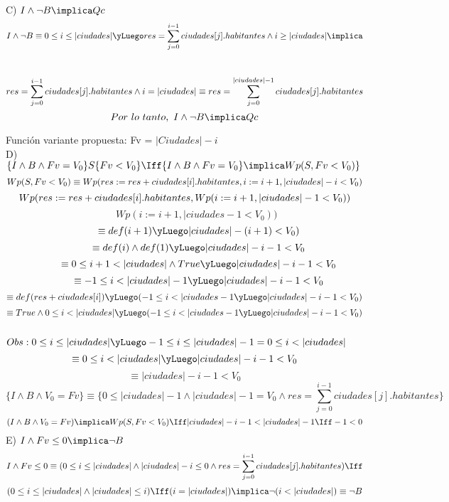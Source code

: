 \documentclass[10pt,a4paper]{article}
\begin{document}
C) $I \land \neg B \implica Qc$\\
\[I \land \neg B \equiv 0 \leq i \leq |ciudades| \yLuego res ={\sum\limits_{j=0}^{i-1}ciudades[j].habitantes} \land i \geq |ciudades|\implica\]\\
\[res = {\sum\limits_{j=0}^{i-1}ciudades[j].habitantes} \land i = |ciudades| \equiv res= {\sum\limits_{j=0}^{|ciudades|-1}ciudades[j].habitantes}\\ \\\]
\[Por \ lo \ tanto, \ I\land \neg B \implica Qc\\ \vspace{0.5cm}\\\]

Función variante propuesta: Fv = $|Ciudades|-i$ \\

D)$\{I \land B \land Fv = V_0\} S \{Fv < V_0\} \Iff \{I \land B \land Fv = V_0\} \implica Wp (S, Fv < V_0 )\}$\\
\[Wp(S,Fv < V_0 ) \equiv Wp(res:=res+ciudades[i].habitantes, i:=i+1,|ciudades|-i<V_0)\\ \]
\[Wp(res:= res+ciudades[i].habitantes, Wp(i:=i+1,|ciudades|-1< V_0))\\\]
\[\hspace{1cm}Wp(i:=i+1,|ciudades-1<V_0))  \]
\[\hspace{1cm}\equiv def (i+1) \yLuego |ciudades|-(i+1) < V_0 )\]
\[\hspace{1cm}\equiv def(i) \land def(1) \yLuego |ciudades|-i-1 < V_0 \]
\[\hspace{1cm}\equiv 0 \leq i+1< |ciudades| \land True \yLuego |ciudades|-i-1 < V_0  \]
\[\hspace{1cm}\equiv -1 \leq i < |ciudades| -1 \yLuego |ciudades|-i-1 < V_0  \\\]
\[\equiv def(res+ciudades[i]) \yLuego (-1 \leq i < |ciudades -1 \yLuego |ciudades|-i-1 < V_0)\]
\[\equiv True \land 0 \leq i < |ciudades| \yLuego (-1 \leq i < |ciudades -1 \yLuego |ciudades|-i-1 < V_0)\]
\\

$Obs: 0 \leq i \leq |ciudades| \yLuego -1 \leq i \leq |ciudades|-1 = 0 \leq i < |ciudades|$\\
\[\equiv 0 \leq i < |ciudades| \yLuego |ciudades|-i-1 < V_0\]
\[\equiv |ciudades| -i-1 < V_0\]
\[\{I \land B \land V_0 = Fv\} \equiv \{0 \leq |ciudades| -1 \land |ciudades|-1 = V_0 \land {res = \sum\limits_{j=0}^{i-1}ciudades[j].habitantes}\}\]
\[(I \land B \land V_0 = Fv) \implica Wp(S,Fv < V_0) \Iff |ciudades| -i-1 < |ciudades|-1 \Iff -1 < 0\] 
\hspace{0.5cm}E) $I \land Fv \leq 0 \implica \neg B$\\
\[I \land Fv \leq 0 \equiv (0 \leq i \leq |ciudades| \land |ciudades|-i \leq 0 \land {res = \sum\limits_{j=0}^{i-1}ciudades[j].habitantes}) \Iff\\\]
\[ (0\leq i \leq |ciudades| \land |ciudades|\leq i) \Iff (i=|ciudades|) \implica \neg(i<|ciudades|) \equiv \neg B\] \\
\end{document}

